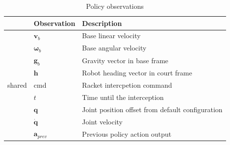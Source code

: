 \documentclass[9pt,twocolumn,twoside]{osajnl}
\begin{document}
\begin{table}
    \centering
    \caption{Policy observations}
    \label{tab:observations}
    \begin{tabular}{p{1.8cm}p{3cm}p{12cm}}
    
    \cellcolor{grey}                                                   & \cellcolor{grey}\textbf{Observation}     & \cellcolor{grey}\textbf{Description}                                                                                                \\ \hline
    \multicolumn{1}{l|}{\multirow{12}{*}{shared}}      & $\mathbf{v}_b$                     & Base linear velocity                                                                                                \\
    \multicolumn{1}{l|}{}                              & $\mathbf{\omega}_b$ & Base angular velocity                                                                                               \\
    \multicolumn{1}{l|}{}                              & $\mathbf{g}_b$                     & Gravity vector in base frame                                                                                        \\
    \multicolumn{1}{l|}{}                              & $\mathbf{h}$                        & Robot heading vector in court frame                                                                                 \\
    \multicolumn{1}{l|}{}                              & cmd                      & Racket intercpetion command                                                                                         \\
    \multicolumn{1}{l|}{}                              & $t$                        & Time until the interception                                                                                         \\
    \multicolumn{1}{l|}{}                              & $\mathbf{q}$                        & Joint position offset from default configuration                                                                    \\
    \multicolumn{1}{l|}{}                              & $\mathbf{\Dot{q}}$                       & Joint velocity                                                                                                      \\
    \multicolumn{1}{l|}{}                              & $\mathbf{a}_{prev}$                  & Previous policy action output                                                                                       \\

\end{tabular}
\end{table}
\end{document}
